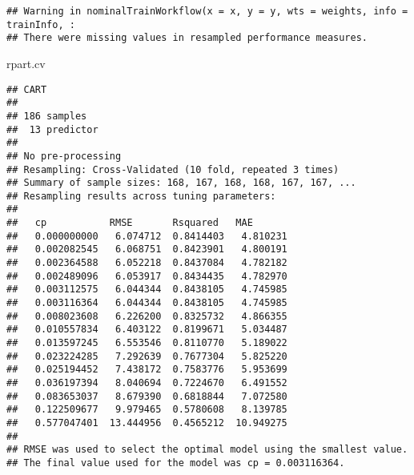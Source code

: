 \documentclass[
]{article}
\newenvironment{Shaded}{\begin{snugshade}}{\end{snugshade}}
\newcommand{\NormalTok}[1]{#1}
\newcommand{\OperatorTok}[1]{\textcolor[rgb]{0.81,0.36,0.00}{\textbf{#1}}}
\newcommand{\StringTok}[1]{\textcolor[rgb]{0.31,0.60,0.02}{#1}}
\begin{document}
\begin{verbatim}
## Warning in nominalTrainWorkflow(x = x, y = y, wts = weights, info = trainInfo, :
## There were missing values in resampled performance measures.
\end{verbatim}

\begin{Shaded}
\begin{Highlighting}[]
\NormalTok{rpart.cv}
\end{Highlighting}
\end{Shaded}

\begin{verbatim}
## CART 
## 
## 186 samples
##  13 predictor
## 
## No pre-processing
## Resampling: Cross-Validated (10 fold, repeated 3 times) 
## Summary of sample sizes: 168, 167, 168, 168, 167, 167, ... 
## Resampling results across tuning parameters:
## 
##   cp           RMSE       Rsquared   MAE      
##   0.000000000   6.074712  0.8414403   4.810231
##   0.002082545   6.068751  0.8423901   4.800191
##   0.002364588   6.052218  0.8437084   4.782182
##   0.002489096   6.053917  0.8434435   4.782970
##   0.003112575   6.044344  0.8438105   4.745985
##   0.003116364   6.044344  0.8438105   4.745985
##   0.008023608   6.226200  0.8325732   4.866355
##   0.010557834   6.403122  0.8199671   5.034487
##   0.013597245   6.553546  0.8110770   5.189022
##   0.023224285   7.292639  0.7677304   5.825220
##   0.025194452   7.438172  0.7583776   5.953699
##   0.036197394   8.040694  0.7224670   6.491552
##   0.083653037   8.679390  0.6818844   7.072580
##   0.122509677   9.979465  0.5780608   8.139785
##   0.577047401  13.444956  0.4565212  10.949275
## 
## RMSE was used to select the optimal model using the smallest value.
## The final value used for the model was cp = 0.003116364.
\end{verbatim}

\begin{Shaded}
\end{Shaded}
\end{document}

